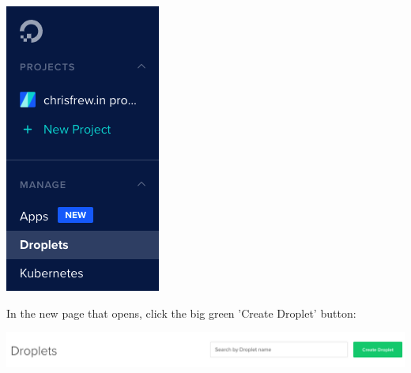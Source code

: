 \documentclass[a4paper,
                             oneside,
                             BCOR1.0cm,
                             DIV11,
                             parskip=full,
                             11pt]{scrbook}
\begin{document}
\begin{center}
\includegraphics[width=\textwidth/3]{droplet/droplets-tab}
\end{center}

In the new page that opens, click the big green 'Create Droplet' button:

\begin{center}
\includegraphics[width=\textwidth]{droplet/new-droplet}
\end{center}
\end{document}
